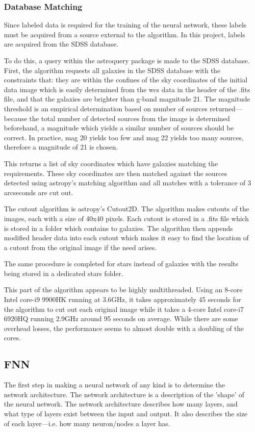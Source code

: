 \documentclass[a4paper,fleqn,usenatbib]{mnras}
\begin{document}
\subsubsection{Database Matching}
Since labeled data is required for the training of the neural network, these labels must be acquired from a source external to the algorithm. In this project, labels are acquired from the SDSS database. 

To do this, a query within the astroquery package is made to the SDSS database. First, the algorithm requests all galaxies in the SDSS database with the constraints that: they are within the confines of the sky coordinates of the initial data image which is easily determined from the wcs data in the header of the .fits file, and that the galaxies are brighter than g-band magnitude 21. The magnitude threshold is an empirical determination based on number of sources returned---because the total number of detected sources from the image is determined beforehand, a magnitude which yields a similar number of sources should be correct. In practice, mag 20 yields too few and mag 22 yields too many sources, therefore a magnitude of 21 is chosen. 

This returns a list of sky coordinates which have galaxies matching the requirements. These sky coordinates are then matched against the sources detected using astropy's matching algorithm and all matches with a tolerance of 3 arcseconds are cut out. 

The cutout algorithm is astropy's Cutout2D. The algorithm makes cutouts of the images, each with a size of 40x40 pixels. Each cutout is stored in a .fits file which is stored in a folder which contains to galaxies. The algorithm then appends modified header data into each cutout which makes it easy to find the location of a cutout from the original image if the need arises. 

The same procedure is completed for stars instead of galaxies with the results being stored in a dedicated stars folder. 

This part of the algorithm appears to be highly multithreaded. Using an 8-core Intel core-i9 9900HK running at 3.6GHz, it takes approximately 45 seconds for the algorithm to cut out each original image while it takes a 4-core Intel core-i7 6920HQ running 2.9GHz around 95 seconds on average. While there are some overhead losses, the performance seems to almost double with a doubling of the cores.
\subsection{FNN}
The first step in making a neural network of any kind is to determine the network architecture. The network architecture is a description of the 'shape' of the neural network. The network architecture describes how many layers, and what type of layers exist between the input and output. It also describes the size of each layer---i.e. how many neuron/nodes a layer has. 
\end{document}
